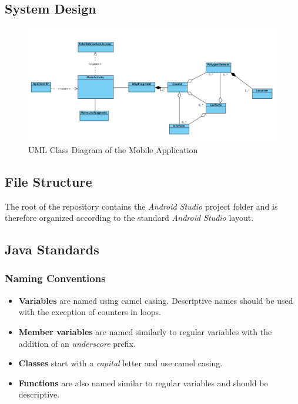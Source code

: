 \documentclass{article}
\begin{document}
    \subsection{System Design}
    \label{sec:ma-design}

    \begin{figure}[h!]
        \centering
        \includegraphics[scale=0.4]{MobileClassDiagram}
        \caption{UML Class Diagram of the Mobile Application}
        \label{fig:mobuml}
    \end{figure}

    \subsection{File Structure}
    \label{sec:ma-struc}

    The root of the repository contains the \textit{Android Studio} project
    folder and is therefore organized according to the standard \textit{Android
    Studio} layout.

    \subsection{Java Standards}
    \label{sec:java}

    \subsubsection{Naming Conventions}
    \label{sec:java-nc}

    \begin{itemize}
        \item \textbf{Variables} are named using camel casing. Descriptive names
                should be used with the exception of counters in loops.
        \item \textbf{Member variables} are named similarly to regular variables
                with the addition of an \textit{underscore} prefix.
        \item \textbf{Classes} start with a \textit{capital} letter and use
                camel casing.
        \item \textbf{Functions} are also named similar to regular variables and
                should be descriptive.
    \end{itemize}
\end{document}
